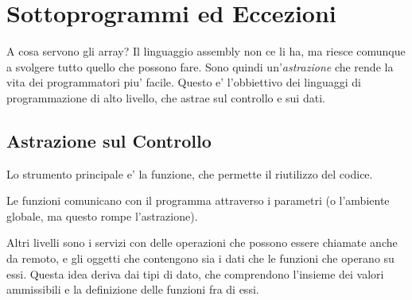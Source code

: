
\chapter{Sottoprogrammi ed Eccezioni}
A cosa servono gli array? Il linguaggio assembly non ce li ha, ma riesce comunque a svolgere tutto quello che possono fare. Sono quindi un'\textit{astrazione} che rende la vita dei programmatori piu' facile. Questo e' l'obbiettivo dei linguaggi di programmazione di alto livello, che astrae sul controllo e sui dati. 

\section{Astrazione sul Controllo}
Lo strumento principale e' la funzione, che permette il riutilizzo del codice.

Le funzioni comunicano con il programma attraverso i parametri (o l'ambiente globale, ma questo rompe l'astrazione). 

Altri livelli sono i servizi con delle operazioni che possono essere chiamate anche da remoto, e gli oggetti che contengono sia i dati che le funzioni che operano su essi. Questa idea deriva dai tipi di dato, che comprendono l'insieme dei valori ammissibili e la definizione delle funzioni fra di essi.




